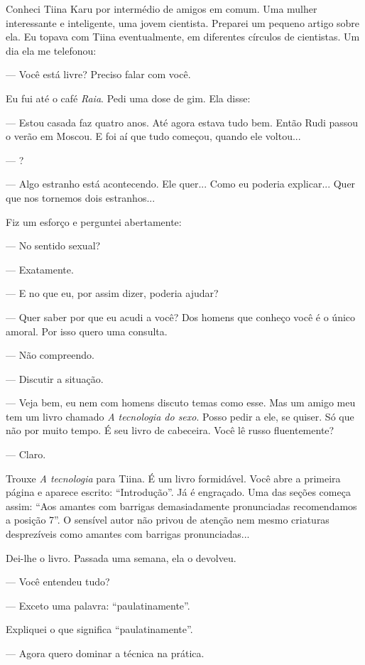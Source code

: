 Conheci Tiina Karu por intermédio de amigos em comum. Uma mulher
interessante e inteligente, uma jovem cientista. Preparei um pequeno
artigo sobre ela. Eu topava com Tiina eventualmente, em diferentes
círculos de cientistas. Um dia ela me telefonou:

--- Você está livre? Preciso falar com você.

Eu fui até o café \emph{Raia}. Pedi uma dose de gim. Ela disse:

--- Estou casada faz quatro anos. Até agora estava tudo bem. Então Rudi
passou o verão em Moscou. E foi aí que tudo começou, quando ele
voltou...

--- ?

--- Algo estranho está acontecendo. Ele quer... Como eu poderia
explicar... Quer que nos tornemos dois estranhos...

Fiz um esforço e perguntei abertamente:

--- No sentido sexual?

--- Exatamente.

--- E no que eu, por assim dizer, poderia ajudar?

--- Quer saber por que eu acudi a você? Dos homens que conheço você é o
único amoral. Por isso quero uma consulta.

--- Não compreendo.

--- Discutir a situação.

--- Veja bem, eu nem com homens discuto temas como esse. Mas um amigo
meu tem um livro chamado \emph{A tecnologia do sexo}. Posso pedir a ele,
se quiser. Só que não por muito tempo. É seu livro de cabeceira. Você lê
russo fluentemente?

--- Claro.

Trouxe \emph{A tecnologia} para Tiina. É um livro formidável. Você abre
a primeira página e aparece escrito: ``Introdução''. Já é engraçado. Uma
das seções começa assim: ``Aos amantes com barrigas demasiadamente
pronunciadas recomendamos a posição 7''. O sensível autor não privou de
atenção nem mesmo criaturas desprezíveis como amantes com barrigas
pronunciadas...

Dei-lhe o livro. Passada uma semana, ela o devolveu.

--- Você entendeu tudo?

--- Exceto uma palavra: ``paulatinamente''.

Expliquei o que significa ``paulatinamente''.

--- Agora quero dominar a técnica na prática.

